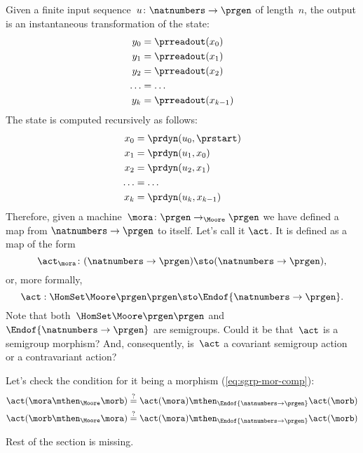 Given a finite input sequence~$u\colon \natnumbers \to \prgen$ of length~$n$, the output is an instantaneous transformation of the state:
%
\begin{equation}
    \label{eq:actions-on-sequences-y}
    \begin{aligned}
        y_0 &= \prreadout(x_0) \\
        y_1 &= \prreadout(x_1) \\
        y_2 &= \prreadout(x_2) \\
        \dots &= \dots  \\
        y_{k} &= \prreadout(x_{k-1})
    \end{aligned}
\end{equation}
%
The state is computed recursively as follows:
\begin{equation}
    \label{eq:actions-on-sequences-x}
    \begin{aligned}
        x_0 &= \prdyn(u_0, \prstart) \\
        x_1 &= \prdyn(u_1, x_0) \\
        x_2 &= \prdyn(u_2, x_1) \\
        \dots &= \dots \\
        x_{k} &= \prdyn(u_{k}, x_{k-1})
    \end{aligned}
\end{equation}
%
Therefore, given a machine~$\mora \colon \prgen \to_{\Moore} \prgen$ we have defined a map from $\natnumbers \to \prgen$ to itself.
Let's call it $\act$.
It is defined as a map of the form
%
\begin{equation}
    \label{eq:actions-on-sequences-1}
    \act_{\mora}\colon  (\natnumbers \to \prgen)  \sto  (\natnumbers \to \prgen),
\end{equation}
%
or, more formally,
%
\begin{equation}
    \label{eq:actions-on-sequences-2}
    \act: \HomSet\Moore\prgen\prgen \sto \Endof {\natnumbers \to \prgen}.
\end{equation}
%
Note that both~$\HomSet\Moore\prgen\prgen$ and $\Endof {\natnumbers \to \prgen}$ are semigroups.
Could it be that~$\act$ is a semigroup morphism? And, consequently, is~$\act$ a covariant semigroup action or a contravariant action?

Let's check the condition for it being a morphism (\cref{eq:sgrp-mor-comp}):
%
\begin{align}
    \act ( \mora \mthen_{\Moore} \morb) &\stackrel{?}{=}  \act ( \mora) \mthen_{\Endof  {\natnumbers \to \prgen}} \act(\morb) \label{eq:actions-on-sequences-left} \\
    \act ( \morb \mthen_{\Moore} \mora) &\stackrel{?}{=}  \act ( \mora) \mthen_{\Endof  {\natnumbers \to \prgen}} \act(\morb) \label{eq:actions-on-sequences-right}
\end{align}
\begin{publictodo}
    Rest of the section is missing.
\end{publictodo}

